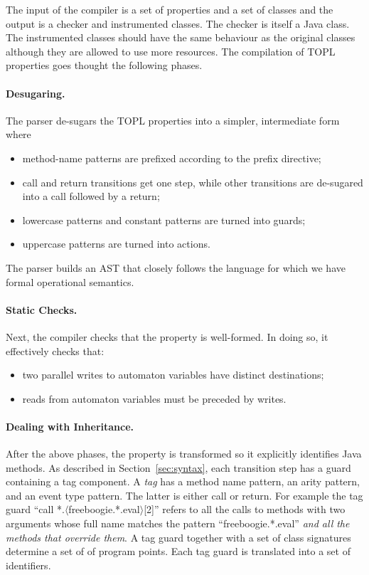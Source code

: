 \documentclass{sigplanconf}[10pt] %
\begin{document}
The input of the compiler is a set of properties and a set of classes and 
the output  is a checker and instrumented classes. The checker is itself a Java class.
The instrumented classes should have the same behaviour as the original classes although 
they are allowed to use more resources.
The compilation of TOPL properties goes thought the following phases.

\paragraph{Desugaring.}
The parser de-sugars the TOPL properties into a simpler, intermediate form where 
\begin{itemize}
\item method-name patterns are prefixed according to the \textsf{prefix} directive;
\item \textsf{call} and \textsf{return} transitions get one step, while other transitions are de-sugared into a \textsf{call} followed by a \textsf{return};
\item lowercase patterns and constant patterns are turned into guards;
\item uppercase patterns are turned into actions.
\end{itemize}
The parser builds an AST that closely follows the language for which we have formal operational semantics.

\paragraph{Static Checks.}
Next, the compiler checks that the property is well-formed.
In doing so, it effectively checks that:
\begin{itemize} 
\item two parallel writes to automaton variables have distinct destinations;
\item reads from automaton variables must be preceded by writes.
\end{itemize}

\paragraph{Dealing with Inheritance.}
After the above phases, the property is transformed so it explicitly identifies Java methods.
As described in Section~\ref{sec:syntax},
each transition step has a guard containing a tag component.
A \emph{tag} has a method name pattern, an arity pattern, and an event type pattern.
The latter is either \textsf{call} or \textsf{return}.
For example the tag guard ``\textsf{call *.$\langle$freeboogie.*.eval$\rangle$[2]}'' refers to all the calls to methods with two arguments whose full name matches the pattern ``\textsf{freeboogie.*.eval}'' \emph{and all the methods that override them}.
A tag guard together with a set of class signatures determine a set of of program points.
Each tag guard is translated into a set of identifiers.
\end{document}
